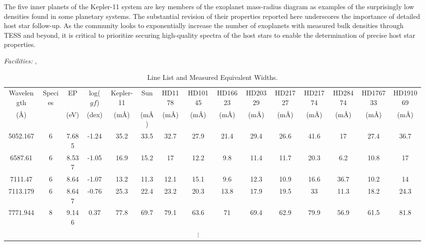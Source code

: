 \documentclass[oneside]{emulateapj}
\begin{document}
The five inner planets of the Kepler-11 system are key members of the exoplanet mass-radius diagram as examples of the surprisingly low densities found in some planetary systems. The substantial revision of their properties reported here underscores the importance of detailed host star follow-up. As the community looks to exponentially increase the number of exoplanets with measured bulk densities through TESS and beyond, it is critical to prioritize securing high-quality spectra of the host stars to enable the determination of precise host star properties.

\bigskip
{}

{\it Facilities:} , 





\pagebreak
\begin{table}
\caption{Line List and Measured Equivalent Widths.}
\label{tbl:ews}
\centering 
\begin{tabular}{ccccccccccccccc} 
\hline
\hline
{Wavelength} & Species & EP & log($gf$) & Kepler-11 & Sun & HD1178 & HD10145 & HD16623 & HD20329 & HD21727 & HD21774 & HD28474 & HD176733 & HD191069 \\
 (\r{A}) &  & (eV) & (dex) & (m\r{A}) & (m\r{A}) & (m\r{A}) & (m\r{A}) & (m\r{A}) & (m\r{A}) & (m\r{A}) & (m\r{A}) & (m\r{A}) & (m\r{A}) & (m\r{A}) \\
\hline
5052.167 & 6  & 7.685 & -1.24 & 35.2 & 33.5 & 32.7 & 27.9 & 21.4 & 29.4 & 26.6 & 41.6 & 17 & 27.4 & 36.7 \\
6587.61 & 6 & 8.537 & -1.05 & 16.9 & 15.2 & 17 & 12.2 & 9.8 & 11.4 & 11.7 & 20.3 & 6.2 & 10.8 & 17 \\
7111.47 & 6 & 8.64 & -1.07 & 13.2 & 11.3 & 12.1 & 15.1 & 9.6 & 12.3 & 10.9 & 16.6 & 36.7 & 10.2 & 14 \\
7113.179 &  6 & 8.647 & -0.76 & 25.3 & 22.4 & 23.2 & 20.3 & 13.8 & 17.9 & 19.5 & 33 & 11.3 & 18.2 & 24.3 \\
7771.944 & 8 & 9.146 & 0.37 & 77.8 & 69.7 & 79.1 & 63.6 & 71 & 69.4 & 62.9 & 79.9 & 56.9 & 61.5 & 81.8 \\
  &  & & & & & & $\vdots$   & &  & & & & \\
\hline       
\end{tabular}


\end{table}
\end{document}
